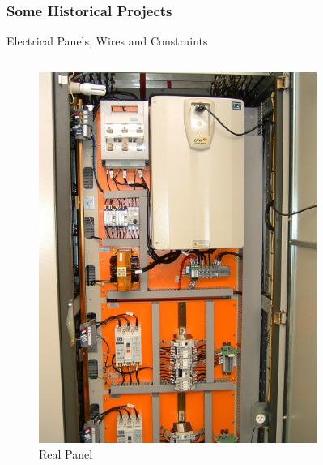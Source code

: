 \documentclass{beamer}
\begin{document}
\subsubsection{Some Historical Projects}

\begin{frame}{Electrical Panels, Wires and Constraints}

\begin{columns} %
  \begin{column}{0.5\textwidth} %
  \begin{figure}[!ht]
    

   \includegraphics[scale=1.0,keepaspectratio]{images/painel.jpg}
   \caption{Real Panel}
     \end{figure}
  \end{column}
   \begin{column}{0.5\textwidth}  %
     \begin{figure}[!ht]

\end{figure}
\end{column}
\end{columns}
\end{frame}
\end{document}
